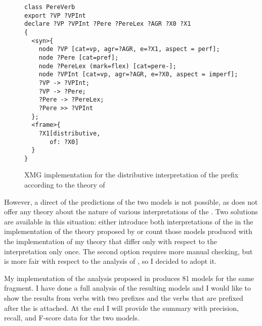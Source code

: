 \begin{figure}
\begin{lstlisting}[style=xmg]
class PereVerb
export ?VP ?VPInt 
declare ?VP ?VPInt ?Pere ?PereLex ?AGR ?X0 ?X1 
{
  <syn>{
    node ?VP [cat=vp, agr=?AGR, e=?X1, aspect = perf];
    node ?Pere [cat=pref];
    node ?PereLex (mark=flex) [cat=pere-];
    node ?VPInt [cat=vp, agr=?AGR, e=?X0, aspect = imperf];
    ?VP -> ?VPInt;
    ?VP -> ?Pere;
    ?Pere -> ?PereLex;
    ?Pere >> ?VPInt
  };
  <frame>{
    ?X1[distributive,
       of: ?X0]
  }
}
\end{lstlisting}
\caption{XMG implementation for the distributive interpretation of the prefix  according to the theory of \citet{Tatevosov:09}\label{xmg:Tat:pere}}
\end{figure}

However, a direct  of the predictions of the two models is not possible, as \citet{Tatevosov:09} does not offer any theory about the nature of various interpretations of the . Two solutions are available in this situation: either introduce both interpretations of the  in the implementation of the theory proposed by \citet{Tatevosov:09} or count those models produced with the implementation of my theory that differ only with respect to the interpretation only once. The second option requires more manual checking, but is more fair with respect to the analysis of \citet{Tatevosov:09}, so I decided to adopt it.

My implementation of the analysis proposed in \citet{Tatevosov:09} produces 81 models for the same fragment. I have done a full analysis of the resulting models and I would like to show the results from verbs with two prefixes and the verbs that are prefixed after the  is attached. At the end I will provide the summary with precision, recall, and F-score data for the two models.


